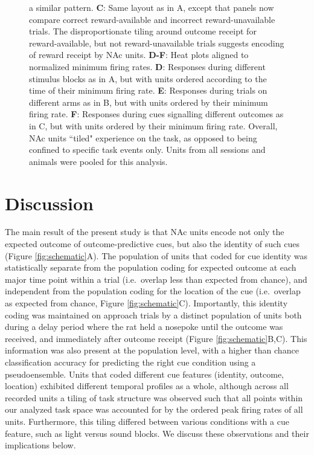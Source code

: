\documentclass[11pt]{article}
\newcommand{\bsf}[1]{\textbf{#1}}
\begin{document}
\begin{figure}[ht!]
{a similar pattern. \bsf{C}: Same layout as in A, except that panels now compare
correct reward-available and incorrect reward-unavailable trials. The disproportionate tiling around outcome receipt for reward-available, but not reward-unavailable
trials suggests encoding of reward receipt by NAc units. \bsf{D-F}: Heat plots aligned to normalized minimum firing rates. \bsf{D}: Responses during different stimulus blocks as in A, but with units ordered according to
the time of their minimum firing rate. \bsf{E}: Responses during trials on different arms as in B, but with units ordered by their minimum
firing rate. \bsf{F}: Responses during cues signalling different outcomes as in C, but with units ordered by their minimum firing
rate. Overall, NAc units ``tiled" experience on the task, as opposed to being
confined to specific task events only. Units from all sessions and animals
were pooled for this analysis.}
\label{fig:NP_tiling}
\end{figure} \clearpage

\section*{Discussion}

The main result of the present study is that NAc units encode not only the expected outcome of outcome-predictive cues, but also the identity of such cues (Figure \ref{fig:schematic}A). The population of units that coded for cue identity was statistically separate from the population coding for expected outcome at each major time point within a trial (i.e.\ overlap less than expected from chance), and independent from the population coding for the location of the cue (i.e.\ overlap as expected from chance, Figure \ref{fig:schematic}C). Importantly, this identity coding was maintained on approach trials by a distinct population of units both during a delay period where the rat held a nosepoke until the outcome was received, and immediately after outcome receipt (Figure \ref{fig:schematic}B,C). This information was also present at the population level, with a higher than chance classification accuracy for predicting the right cue condition using a pseudoensemble. Units that coded different cue features (identity, outcome, location) exhibited different temporal profiles as a whole, although across all recorded units a tiling of task structure was observed such that all points within our analyzed task space was accounted for by the ordered peak firing rates of all units. Furthermore, this tiling differed between various conditions with a cue feature, such as light versus sound blocks. We discuss these observations and their implications below.
\end{document}
